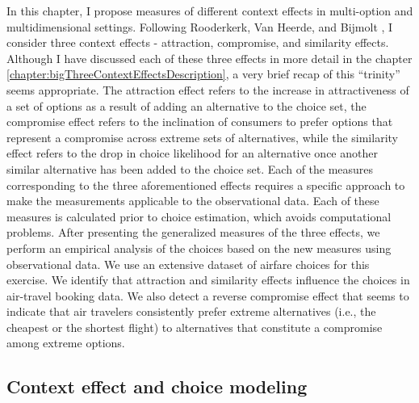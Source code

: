 \documentclass[a4paper,12pt]{article}
\newcommand{\citeyearonly}[1]{\citeyearpar{#1}}
\begin{document}
In this chapter, I propose measures of different context effects in multi-option and multidimensional settings. Following Rooderkerk, Van Heerde, and Bijmolt \citeyearonly{roodrkerkEtAl11}, I consider three context effects - attraction, compromise, and similarity effects. Although I have discussed each of these three effects in more detail in the chapter \ref{chapter:bigThreeContextEffectsDescription}, a very brief recap of this ``trinity'' seems appropriate. The attraction effect refers to the increase in attractiveness of a set of options as a result of adding an alternative to the choice set, the compromise effect refers to the inclination of consumers to prefer options that represent a compromise across extreme sets of alternatives, while the similarity effect refers to the drop in choice likelihood for an alternative once another similar alternative has been added to the choice set. Each of the measures corresponding to the three aforementioned effects requires a specific approach to make the measurements applicable to the observational data. Each of these measures is calculated prior to choice estimation, which avoids computational problems. After presenting the generalized measures of the three effects, we perform an empirical analysis of the choices based on the new measures using observational data. We use an extensive dataset of airfare choices for this exercise. We identify that attraction and similarity effects influence the choices in air-travel booking data. We also detect a reverse compromise effect that seems to indicate that air travelers consistently prefer extreme alternatives (i.e., the cheapest or the shortest flight) to alternatives that constitute a compromise among extreme options.

\subsection{Context effect and choice modeling}
\end{document}
